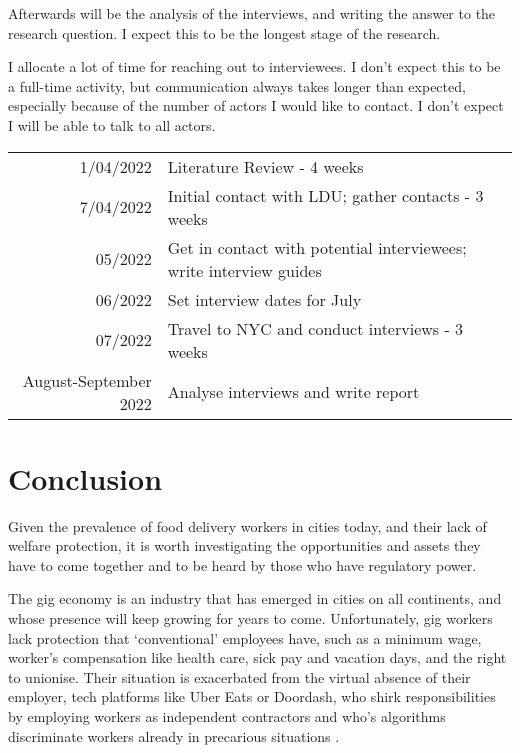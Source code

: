 \documentclass{article}
\begin{document}
Afterwards will be the analysis of the interviews, and writing the answer to the research question. I expect this to be the longest stage of the research. 

I allocate a lot of time for reaching out to interviewees. I don't expect this to be a full-time activity, but communication always takes longer than expected, especially because of the number of actors I would like to contact. I don't expect I will be able to talk to all actors.

\newcommand{\foo}{\hspace{-2.3pt}$\bullet$ \hspace{5pt}}

\begin{tabular}{r |@{\foo} l}

1/04/2022 & Literature Review - 4 weeks\\
7/04/2022 & Initial contact with LDU; gather contacts - 3 weeks\\
05/2022 & Get in contact with potential interviewees; write interview guides\\
06/2022 & Set interview dates for July\\
07/2022 & Travel to NYC and conduct interviews - 3 weeks\\
August-September 2022 & Analyse interviews and write report\\

\end{tabular}


\section{Conclusion}

Given the prevalence of food delivery workers in cities today, and their lack of welfare protection, it is worth investigating the opportunities and assets they have to come together and to be heard by those who have regulatory power.

The gig economy is an industry that has emerged in cities on all continents, and whose presence will keep growing for years to come. Unfortunately, gig workers lack protection that `conventional’ employees have, such as a minimum wage, worker’s compensation like health care, sick pay and vacation days, and the right to unionise. Their situation is exacerbated from the virtual absence of their employer, tech platforms like Uber Eats or Doordash, who shirk responsibilities by employing workers as independent contractors and who’s algorithms discriminate workers already in precarious situations \parencite{kellogg2020algorithms}.
\end{document}
